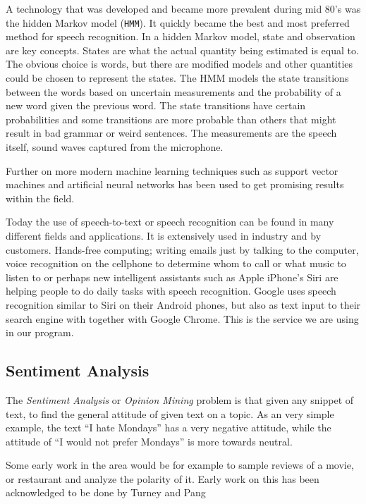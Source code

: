 \documentclass[a4paper,12pt,twoside]{ltxdoc}
\begin{document}
A technology that was developed and became more prevalent during mid 80's was the hidden Markov model (\verb#HMM#). It quickly became the best and most preferred method for speech recognition. In a hidden Markov model, state and observation are key concepts. States are what the actual quantity being estimated is equal to. The obvious choice is words, but there are modified models and other quantities could be chosen to represent the states. The HMM models the state transitions between the words based on uncertain measurements and the probability of a new word given the previous word. The state transitions have certain probabilities and some transitions are more probable than others that might result in bad grammar or weird sentences.  The measurements are the speech itself, sound waves captured from the microphone\cite{history}.

Further on more modern machine learning techniques such as support vector machines and artificial neural networks has been used to get promising results within the field.

Today the use of speech-to-text or speech recognition can be found in many different fields and applications. It is extensively used in industry and by customers. Hands-free computing; writing emails just by talking to the computer, voice recognition on the cellphone to determine whom to call or what music to listen to or perhaps new intelligent assistants such as Apple iPhone's Siri are helping people to do daily tasks with speech recognition. Google uses speech recognition similar to Siri on their Android phones, but also as text input to their search engine with together with Google Chrome. This is the service we are using in our program.



\subsection{Sentiment Analysis}
The \emph{Sentiment Analysis} or \emph{Opinion Mining} problem is that given any snippet of text, to find the general attitude of given text on a topic.
As an very simple example, the text ``I hate Mondays'' has a very negative attitude, while the attitude of ``I would not prefer Mondays'' is more towards neutral.

Some early work in the area would be for example to sample reviews of a movie, or restaurant and analyze the polarity of it. Early work on this has been acknowledged to be done by Turney\cite{turney} and Pang\cite{pang}
\end{document}
